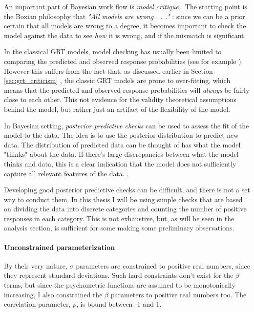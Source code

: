 \documentclass{article}\usepackage{knitr}
\begin{document}
An important part of Bayesian work flow is \textit{model critique} \citep[Part II]{bda}. The starting point is the Boxian philosophy that \textit{"All models are wrong . . ."} \citep{box2005}: since we can be a prior certain that all models are wrong to a degree, it becomes important to check the model against the data to see \textit{how} it is wrong, and if the mismatch is significant.

In the classical GRT models, model checking has usually been limited to comparing the predicted and observed response probabilities  (see for example \citet[Figure 4]{silbert2009}).  However this suffers from the fact that, as discussed earlier in Section \ref{sec:grt_criticism} \textit{}, the classic GRT models are prone to over-fitting, which means that the predicted and observed response probabilities will \textit{always} be fairly close to each other. This not evidence for the validity theoretical assumptions behind the model, but rather just an artifact of the flexibility of the model.

In Bayesian setting, \textit{posterior predictive checks} can be used to assess the fit of the model to the data. The idea is to use the posterior distribution to predict new data. The distribution of predicted data can be thought of has what the model "thinks" about the data. If there's large discrepancies between what the model thinks and data, this is a clear indication that the model does not sufficiently capture all relevant features of the data. \citep[Chapter 7]{bda}.

Developing good posterior predictive checks can be difficult, and there is not a set way to conduct them. In this thesis I will be using simple checks that are based on dividing the data into discrete categories and counting the number of positive responses in each category. This is not exhaustive, but, as will be seen in the analysis section, is sufficient for some making some preliminary observations. 

\paragraph{Unconstrained parameterization}

By their very nature, $\sigma$ parameters are constrained to positive real numbers, since they represent standard deviations. Such hard constraints don't exist for the $\beta$ terms, but since the psychometric functions are assumed to be monotonically increasing, I also constrained the $\beta$ parameters to positive real numbers too. The correlation parameter, $\rho$, is bound between -1 and 1. 
\end{document}
